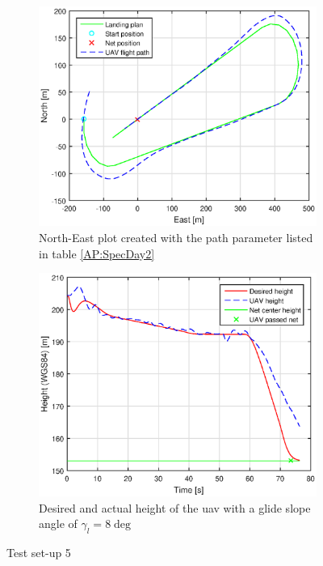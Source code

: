 \begin{figure}[H]
\centering
\begin{subfigure}{0.7\textwidth}
		\includegraphics[width=\textwidth]{figs/Experiment/NorthEast1juni081328.eps}
\caption{North-East plot created with the path parameter listed in table \ref{AP:SpecDay2}}
\label{Fig:NorthEast1juni081328}
\end{subfigure}
\begin{subfigure}{0.7\textwidth}
		\includegraphics[width=\textwidth]{figs/Experiment/Height1juni081328.eps}
\caption{Desired and actual height of the \gls{uav} with a glide slope angle of $\gamma_l = 8 \deg$}
\label{Fig:Height1juni081328}
\end{subfigure}
\caption{Test set-up 5}
\label{Fig:Test5}
\end{figure}

